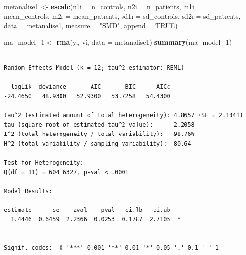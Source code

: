 \documentclass[12pt,brazil,oneside]{book}
\newenvironment{Shaded}{\begin{snugshade}}{\end{snugshade}}
\newcommand{\DataTypeTok}[1]{\textcolor[rgb]{0.13,0.29,0.53}{#1}}
\newcommand{\DecValTok}[1]{\textcolor[rgb]{0.00,0.00,0.81}{#1}}
\newcommand{\KeywordTok}[1]{\textcolor[rgb]{0.13,0.29,0.53}{\textbf{#1}}}
\newcommand{\NormalTok}[1]{#1}
\newcommand{\OperatorTok}[1]{\textcolor[rgb]{0.81,0.36,0.00}{\textbf{#1}}}
\newcommand{\OtherTok}[1]{\textcolor[rgb]{0.56,0.35,0.01}{#1}}
\newcommand{\StringTok}[1]{\textcolor[rgb]{0.31,0.60,0.02}{#1}}
\begin{document}
\begin{Shaded}
\begin{Highlighting}[]
\NormalTok{metanalise1 <-}\StringTok{ }\KeywordTok{escalc}\NormalTok{(}\DataTypeTok{n1i =}\NormalTok{ n_controls, }\DataTypeTok{n2i =}\NormalTok{ n_patients, }\DataTypeTok{m1i =}\NormalTok{ mean_controls, }\DataTypeTok{m2i =}\NormalTok{ mean_patients, }
    \DataTypeTok{sd1i =}\NormalTok{ sd_controls, }\DataTypeTok{sd2i =}\NormalTok{ sd_patients, }\DataTypeTok{data =}\NormalTok{ metanalise1, }\DataTypeTok{measure =} \StringTok{"SMD"}\NormalTok{, }
    \DataTypeTok{append =} \OtherTok{TRUE}\NormalTok{)}
\end{Highlighting}
\end{Shaded}

\begin{Shaded}
\begin{Highlighting}[]
\NormalTok{ma_model_}\DecValTok{1}\NormalTok{ <-}\StringTok{ }\KeywordTok{rma}\NormalTok{(yi, vi, }\DataTypeTok{data =}\NormalTok{ metanalise1)}
\KeywordTok{summary}\NormalTok{(ma_model_}\DecValTok{1}\NormalTok{)}
\end{Highlighting}
\end{Shaded}

\begin{verbatim}

Random-Effects Model (k = 12; tau^2 estimator: REML)

  logLik  deviance       AIC       BIC      AICc  
-24.4650   48.9300   52.9300   53.7258   54.4300  

tau^2 (estimated amount of total heterogeneity): 4.8657 (SE = 2.1341)
tau (square root of estimated tau^2 value):      2.2058
I^2 (total heterogeneity / total variability):   98.76%
H^2 (total variability / sampling variability):  80.64

Test for Heterogeneity: 
Q(df = 11) = 604.6327, p-val < .0001

Model Results:

estimate      se    zval    pval   ci.lb   ci.ub   
  1.4446  0.6459  2.2366  0.0253  0.1787  2.7105  *

---
Signif. codes:  0 '***' 0.001 '**' 0.01 '*' 0.05 '.' 0.1 ' ' 1 
\end{verbatim}

\begin{Shaded}
\end{Shaded}
\end{document}
